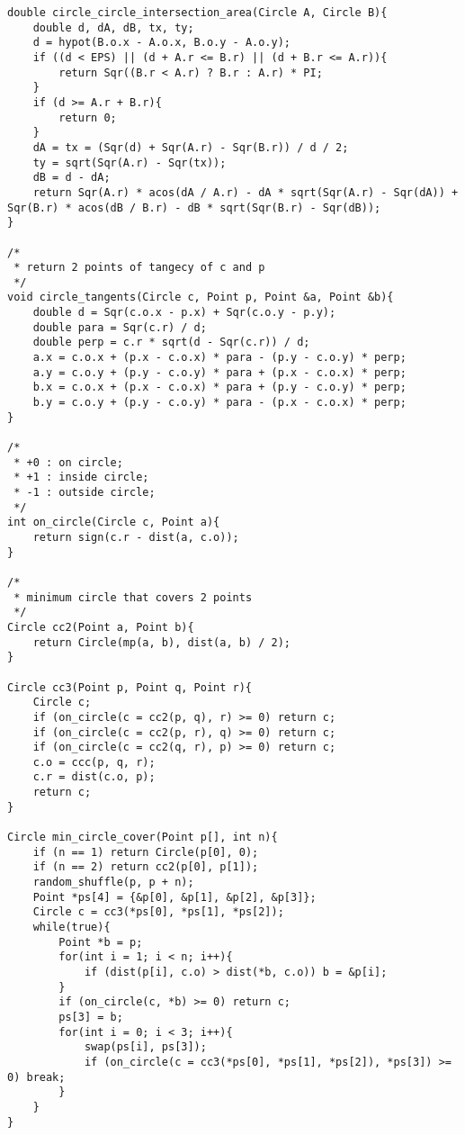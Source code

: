 \begin{verbatim}
double circle_circle_intersection_area(Circle A, Circle B){
	double d, dA, dB, tx, ty;
	d = hypot(B.o.x - A.o.x, B.o.y - A.o.y);
	if ((d < EPS) || (d + A.r <= B.r) || (d + B.r <= A.r)){
		return Sqr((B.r < A.r) ? B.r : A.r) * PI;
	}
	if (d >= A.r + B.r){
		return 0;
	}
	dA = tx = (Sqr(d) + Sqr(A.r) - Sqr(B.r)) / d / 2;
	ty = sqrt(Sqr(A.r) - Sqr(tx));
	dB = d - dA;
	return Sqr(A.r) * acos(dA / A.r) - dA * sqrt(Sqr(A.r) - Sqr(dA)) + Sqr(B.r) * acos(dB / B.r) - dB * sqrt(Sqr(B.r) - Sqr(dB));
}

/*
 * return 2 points of tangecy of c and p
 */
void circle_tangents(Circle c, Point p, Point &a, Point &b){
	double d = Sqr(c.o.x - p.x) + Sqr(c.o.y - p.y);
	double para = Sqr(c.r) / d;
	double perp = c.r * sqrt(d - Sqr(c.r)) / d;
	a.x = c.o.x + (p.x - c.o.x) * para - (p.y - c.o.y) * perp;
	a.y = c.o.y + (p.y - c.o.y) * para + (p.x - c.o.x) * perp;
	b.x = c.o.x + (p.x - c.o.x) * para + (p.y - c.o.y) * perp;
	b.y = c.o.y + (p.y - c.o.y) * para - (p.x - c.o.x) * perp;
}

/*
 * +0 : on circle;
 * +1 : inside circle;
 * -1 : outside circle;
 */
int on_circle(Circle c, Point a){
	return sign(c.r - dist(a, c.o));
}

/*
 * minimum circle that covers 2 points
 */
Circle cc2(Point a, Point b){
	return Circle(mp(a, b), dist(a, b) / 2);
}

Circle cc3(Point p, Point q, Point r){
	Circle c;
	if (on_circle(c = cc2(p, q), r) >= 0) return c;
	if (on_circle(c = cc2(p, r), q) >= 0) return c;
	if (on_circle(c = cc2(q, r), p) >= 0) return c;
	c.o = ccc(p, q, r);
	c.r = dist(c.o, p);
	return c;
}

Circle min_circle_cover(Point p[], int n){
	if (n == 1) return Circle(p[0], 0);
	if (n == 2) return cc2(p[0], p[1]);
	random_shuffle(p, p + n);
	Point *ps[4] = {&p[0], &p[1], &p[2], &p[3]};
	Circle c = cc3(*ps[0], *ps[1], *ps[2]);
	while(true){
		Point *b = p;
		for(int i = 1; i < n; i++){
			if (dist(p[i], c.o) > dist(*b, c.o)) b = &p[i];
		}
		if (on_circle(c, *b) >= 0) return c;
		ps[3] = b;
		for(int i = 0; i < 3; i++){
			swap(ps[i], ps[3]);
			if (on_circle(c = cc3(*ps[0], *ps[1], *ps[2]), *ps[3]) >= 0) break;
		}
	}
}

\end{verbatim}
